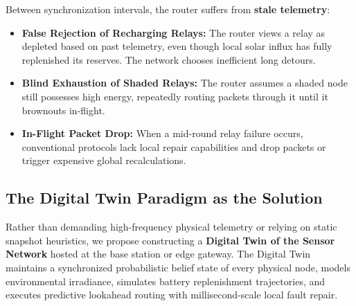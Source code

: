 \documentclass[journal]{IEEEtran}
\begin{document}
Between synchronization intervals, the router suffers from \textbf{stale telemetry}:
\begin{itemize}
    \item \textbf{False Rejection of Recharging Relays:} The router views a relay as depleted based on past telemetry, even though local solar influx has fully replenished its reserves. The network chooses inefficient long detours.
    \item \textbf{Blind Exhaustion of Shaded Relays:} The router assumes a shaded node still possesses high energy, repeatedly routing packets through it until it brownouts in-flight.
    \item \textbf{In-Flight Packet Drop:} When a mid-round relay failure occurs, conventional protocols lack local repair capabilities and drop packets or trigger expensive global recalculations.
\end{itemize}

\subsection{The Digital Twin Paradigm as the Solution}
Rather than demanding high-frequency physical telemetry or relying on static snapshot heuristics, we propose constructing a \textbf{Digital Twin of the Sensor Network} hosted at the base station or edge gateway. The Digital Twin maintains a synchronized probabilistic belief state of every physical node, models environmental irradiance, simulates battery replenishment trajectories, and executes predictive lookahead routing with millisecond-scale local fault repair.
\end{document}
